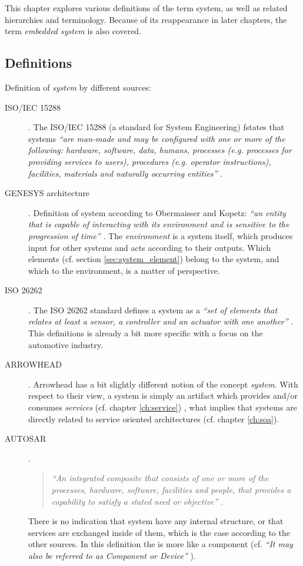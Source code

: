 \label{ch:system}
This chapter explores various definitions of the term system, as well as related hierarchies and terminology. Because of its reappearance in later chapters, the term \emph{embedded system} is also covered.

\subsection{Definitions}
Definition of \emph{system} by different sources:
\begin{description}
\item [ISO/IEC 15288] .
The ISO/IEC 15288 (a standard for System Engineering) fstates that systems \textit{``are man-made and may be configured with one or more of the following: hardware, software, data, humans, processes (e.g. processes for providing services to users), procedures (e.g. operator instructions), facilities, materials and naturally occurring entities''} \cite{ISO_15288}.

\item [GENESYS architecture].
Definition of system according to Obermaisser and Kopetz: \emph{``an entity that is capable of interacting with its environment and is sensitive to the progression of time''} \cite[p.7]{genesys}.
The \emph{environment} is a system itself, which produces input for other systems and acts according to their outputs. Which elements (cf. section \ref{sec:system_element}) belong to the system, and which to the environment, is a matter of perspective. 

\item [ISO 26262].
The ISO 26262 standard defines a system as a \emph{``set of elements that relates at least a sensor, a controller and an actuator with one another''} \cite{iso26262:1}. This definitions is already a bit more specific with a focus on the automotive industry.

\item [ARROWHEAD].
Arrowhead has a bit slightly different notion of the concept \emph{system}. With respect to their view, a system is simply an artifact which provides and/or consumes \emph{services} (cf. chapter \ref{ch:service}) \cite{arrowhead_inpr}, what implies that systems are directly related to service oriented architectures (cf. chapter \ref{ch:soa}).

\item [AUTOSAR].
\begin{quote}
\emph{``An integrated composite that consists of one or more of the processes, hardware, software, facilities and people, that provides a capability to satisfy a stated need or objective''} \cite{autosar_glossary}.
\end{quote}

There is no indication that system have any internal structure, or that services are exchanged inside of them, which is the case according to the other sources. In this definition the is more like a component (cf. \emph{``It may also be referred to as Component or Device''} \cite{arrowhead_inpr}).
\end{description}

